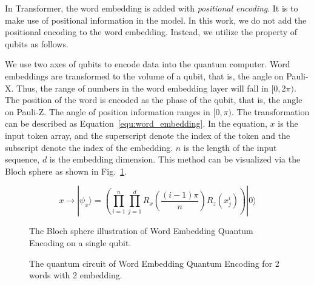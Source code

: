 In Transformer, the word embedding is added with \emph{positional encoding}. It is to make use of positional information in the model. In this work, we do not add the positional encoding to the word embedding. Instead, we utilize the property of qubits as follows.

We use two axes of qubits to encode data into the quantum computer. Word embeddings are transformed to the volume of a qubit, that is, the angle on Pauli-X. Thus, the range of numbers in the word embedding layer will fall in $[0, 2\pi)$. The position of the word is encoded as the phase of the qubit, that is, the angle on Pauli-Z. The angle of position information ranges in $[0, \pi)$. The transformation can be described as Equation~\ref{equ:word_embedding}. In the equation, $x$ is the input token array, and the superscript denote the index of the token and the subscript denote the index of the embedding. $n$ is the length of the input sequence, $d$ is the embedding dimension. This method can be visualized via the Bloch sphere as shown in Fig.~\ref{fig:word-sphere}.

\begin{equation} \label{equ:word_embedding}
x \rightarrow |\psi_x\rangle = ( \prod_{i=1}^n \prod_{j=1}^d R_x( \frac{(i-1) \pi}{n} )R_z(x^i_j) ) |0\rangle
\end{equation}

\begin{figure}[htp!]
    \centering
    \caption{The Bloch sphere illustration of Word Embedding Quantum Encoding on a single qubit.}
    \label{fig:word-sphere}
\end{figure}

\begin{figure}[htp!]
  \centering
  \caption{The quantum circuit of Word Embedding Quantum Encoding for 2 words with 2 embedding.}
  \label{fig:embedding}
\end{figure}

